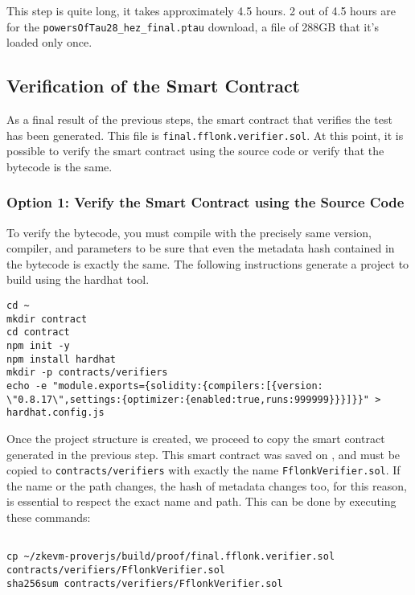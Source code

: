This step is quite long, it takes approximately 4.5 hours. 2 out of 4.5 hours are for the \texttt{powersOfTau28\_hez\_final.ptau} download, a file of 288GB that it’s loaded only once.

\subsection{Verification of the Smart Contract}

As a final result of the previous steps, the smart contract that verifies the test has been generated. This file is \texttt{final.fflonk.verifier.sol}. At this point, it is possible to verify the smart contract using the source code or verify that the bytecode is the same. 

\subsubsection{Option 1: Verify the Smart Contract using the Source Code}

To verify the bytecode, you must compile with the precisely same version, compiler, and parameters to be sure that even the metadata hash contained in the bytecode is exactly the same. The following instructions generate a project to build using the hardhat tool.

\begin{lstlisting}[style=termt]
cd ~
mkdir contract
cd contract
npm init -y 
npm install hardhat
mkdir -p contracts/verifiers
echo -e "module.exports={solidity:{compilers:[{version: \"0.8.17\",settings:{optimizer:{enabled:true,runs:999999}}}]}}" > hardhat.config.js
\end{lstlisting}

Once the project structure is created, we proceed to copy the smart contract generated in the previous step. This smart contract was saved on , and must be copied to \texttt{contracts/verifiers} with exactly the name \texttt{FflonkVerifier.sol}. If the name or the path changes, the hash of metadata changes too, for this reason, is essential to respect the exact name and path. This can be done by executing these commands:

\begin{lstlisting}[style=termt]

cp ~/zkevm-proverjs/build/proof/final.fflonk.verifier.sol contracts/verifiers/FflonkVerifier.sol
sha256sum contracts/verifiers/FflonkVerifier.sol
\end{lstlisting}

